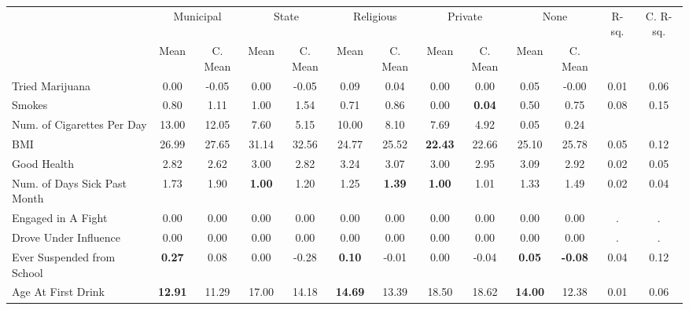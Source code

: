\begin{tabular}{l c c c c c c c c c c c c}
\toprule
& \multicolumn{2}{c}{Municipal} & \multicolumn{2}{c}{State} & \multicolumn{2}{c}{Religious} & \multicolumn{2}{c}{Private} & \multicolumn{2}{c}{None} & R-sq. & C. R-sq. \\
& \scriptsize Mean & \scriptsize C. Mean & \scriptsize Mean & \scriptsize C. Mean & \scriptsize Mean & \scriptsize C. Mean & \scriptsize Mean & \scriptsize C. Mean & \scriptsize Mean & \scriptsize C. Mean & & \\
\midrule
Tried Marijuana &      0.00 & -0.05 &      0.00 & -0.05 &      0.09 & 0.04 &      0.00 & 0.00 &      0.05 & -0.00 &      0.01 &      0.06 \\
Smokes &      0.80 & 1.11 &      1.00 & 1.54 &      0.71 & 0.86 &      0.00 & \textbf{     0.04} &      0.50 & 0.75 &      0.08 &      0.15 \\
Num. of Cigarettes Per Day &     13.00 & 12.05 &      7.60 & 5.15 &     10.00 & 8.10 &      7.69 & 4.92 &      0.05 &      0.24 \\
BMI &     26.99 & 27.65 &     31.14 & 32.56 &     24.77 & 25.52 & \textbf{    22.43} & 22.66 &     25.10 & 25.78 &      0.05 &      0.12 \\
Good Health &      2.82 & 2.62 &      3.00 & 2.82 &      3.24 & 3.07 &      3.00 & 2.95 &      3.09 & 2.92 &      0.02 &      0.05 \\
Num. of Days Sick Past Month &      1.73 & 1.90 & \textbf{     1.00} & 1.20 &      1.25 & \textbf{     1.39} & \textbf{     1.00} & 1.01 &      1.33 & 1.49 &      0.02 &      0.04 \\
Engaged in A Fight &      0.00 & 0.00 &      0.00 & 0.00 &      0.00 & 0.00 &      0.00 & 0.00 &      0.00 & 0.00 &         . &         . \\
Drove Under Influence &      0.00 & 0.00 &      0.00 & 0.00 &      0.00 & 0.00 &      0.00 & 0.00 &      0.00 & 0.00 &         . &         . \\
Ever Suspended from School & \textbf{     0.27} & 0.08 &      0.00 & -0.28 & \textbf{     0.10} & -0.01 &      0.00 & -0.04 & \textbf{     0.05} & \textbf{    -0.08} &      0.04 &      0.12 \\
Age At First Drink & \textbf{    12.91} & 11.29 &     17.00 & 14.18 & \textbf{    14.69} & 13.39 &     18.50 & 18.62 & \textbf{    14.00} & 12.38 &      0.01 &      0.06 \\
\bottomrule
\end{tabular}
